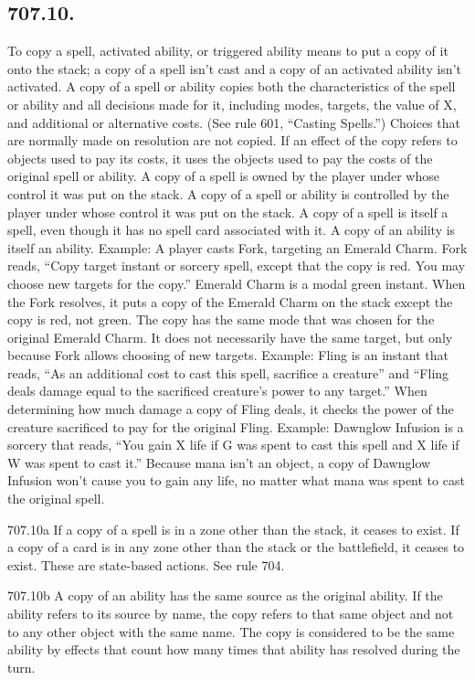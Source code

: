 \subsection*{707.10.}
To copy a spell, activated ability, or triggered ability means to put a copy of it onto the stack; a copy of a spell isn’t cast and a copy of an activated ability isn’t activated. A copy of a spell or ability copies both the characteristics of the spell or ability and all decisions made for it, including modes, targets, the value of X, and additional or alternative costs. (See rule 601, “Casting Spells.”) Choices that are normally made on resolution are not copied. If an effect of the copy refers to objects used to pay its costs, it uses the objects used to pay the costs of the original spell or ability. A copy of a spell is owned by the player under whose control it was put on the stack. A copy of a spell or ability is controlled by the player under whose control it was put on the stack. A copy of a spell is itself a spell, even though it has no spell card associated with it. A copy of an ability is itself an ability.
Example: A player casts Fork, targeting an Emerald Charm. Fork reads, “Copy target instant or sorcery spell, except that the copy is red. You may choose new targets for the copy.” Emerald Charm is a modal green instant. When the Fork resolves, it puts a copy of the Emerald Charm on the stack except the copy is red, not green. The copy has the same mode that was chosen for the original Emerald Charm. It does not necessarily have the same target, but only because Fork allows choosing of new targets.
Example: Fling is an instant that reads, “As an additional cost to cast this spell, sacrifice a creature” and “Fling deals damage equal to the sacrificed creature’s power to any target.” When determining how much damage a copy of Fling deals, it checks the power of the creature sacrificed to pay for the original Fling.
Example: Dawnglow Infusion is a sorcery that reads, “You gain X life if {G} was spent to cast this spell and X life if {W} was spent to cast it.” Because mana isn’t an object, a copy of Dawnglow Infusion won’t cause you to gain any life, no matter what mana was spent to cast the original spell.

707.10a If a copy of a spell is in a zone other than the stack, it ceases to exist. If a copy of a card is in any zone other than the stack or the battlefield, it ceases to exist. These are state-based actions. See rule 704.

707.10b A copy of an ability has the same source as the original ability. If the ability refers to its source by name, the copy refers to that same object and not to any other object with the same name. The copy is considered to be the same ability by effects that count how many times that ability has resolved during the turn.

